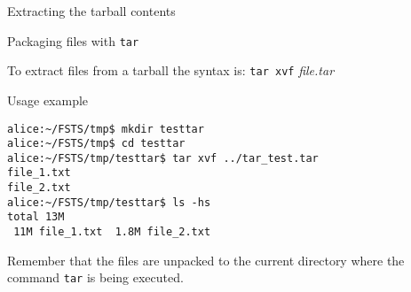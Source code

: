 \begin{frame}[t,fragile]{Extracting the tarball contents}

  \vspace{-0.3cm}
  \begin{block}{Packaging files with \alert{\texttt{tar}}}
    {\footnotesize To extract files from a tarball the syntax is:
  \alert{\texttt{tar xvf}} \emph{file.tar} 

  Usage example  }



{\footnotesize
        \begin{lstlisting}
alice:~/FSTS/tmp$ mkdir testtar
alice:~/FSTS/tmp$ cd testtar
alice:~/FSTS/tmp/testtar$ tar xvf ../tar_test.tar 
file_1.txt
file_2.txt
alice:~/FSTS/tmp/testtar$ ls -hs
total 13M
 11M file_1.txt  1.8M file_2.txt
        \end{lstlisting}

}
{\footnotesize Remember that the files are unpacked to the current
  directory where the command \texttt{tar} is being executed.}
  \end{block}
  
\end{frame}
